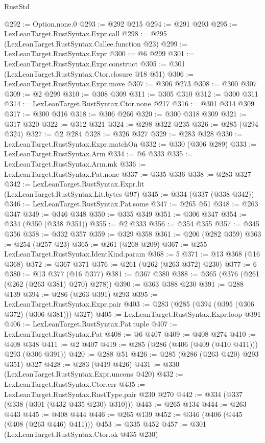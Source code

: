 \begin{lexlean}{RustStd}
\begin{coremodule}
@292 := Option.none.{0}
@293 := @292 @215
@294 := @291 @293
@295 := LexLeanTarget.RustSyntax.Expr.call
@298 := @295 (LexLeanTarget.RustSyntax.Callee.function @23)
@299 := LexLeanTarget.RustSyntax.Expr
@300 := @6 @299
@301 := LexLeanTarget.RustSyntax.Expr.construct
@305 := @301 (LexLeanTarget.RustSyntax.Ctor.closure @18 @51)
@306 := LexLeanTarget.RustSyntax.Expr.move
@307 := @306 @273
@308 := @300 @307
@309 := @2 @299
@310 := @308 @309
@311 := @305 @310
@312 := @300 @311
@314 := LexLeanTarget.RustSyntax.Ctor.none @217
@316 := @301 @314 @309
@317 := @300 @316
@318 := @306 @266
@320 := @300 @318 @309
@321 := @317 @320
@322 := @312 @321
@324 := @298 @322 @235
@326 := @285 (@294 @324)
@327 := @2 @284
@328 := @326 @327
@329 := @283 @328
@330 := LexLeanTarget.RustSyntax.Expr.matchOn
@332 := @330 (@306 @289)
@333 := LexLeanTarget.RustSyntax.Arm
@334 := @6 @333
@335 := LexLeanTarget.RustSyntax.Arm.mk
@336 := LexLeanTarget.RustSyntax.Pat.none
@337 := @335 @336
@338 := @283 @327
@342 := LexLeanTarget.RustSyntax.Expr.lit (LexLeanTarget.RustSyntax.Lit.bytes @97)
@345 := @334 (@337 (@338 @342))
@346 := LexLeanTarget.RustSyntax.Pat.some
@347 := @265 @51
@348 := @263 @347
@349 := @346 @348
@350 := @335 @349
@351 := @306 @347
@354 := @334 (@350 (@338 @351))
@355 := @2 @333
@356 := @354 @355
@357 := @345 @356
@358 := @332 @357
@359 := @329 @358
@361 := @206 (@282 @359)
@363 := @254 (@257 @23)
@365 := @261 (@268 @209)
@367 := @255 LexLeanTarget.RustSyntax.IdentKind.param
@368 := 5
@371 := @13 @368 (@16 @368)
@372 := @367 @371
@376 := @261 (@262 (@263 @372) @230)
@377 := 6
@380 := @13 @377 (@16 @377)
@381 := @367 @380
@388 := @365 (@376 (@261 (@262 (@263 @381) @270) @278))
@390 := @363 @388 @230
@391 := @288 @139
@394 := @286 (@263 @391) @293
@395 := LexLeanTarget.RustSyntax.Expr.pair
@403 := @283 (@285 (@394 (@395 (@306 @372) (@306 @381))) @327)
@405 := LexLeanTarget.RustSyntax.Expr.loop @391
@406 := LexLeanTarget.RustSyntax.Pat.tuple
@407 := LexLeanTarget.RustSyntax.Pat
@408 := @6 @407
@409 := @408 @274
@410 := @408 @348
@411 := @2 @407
@419 := @285 (@286 (@406 (@409 (@410 @411))) @293 (@306 @391))
@420 := @288 @51
@426 := @285 (@286 (@263 @420) @293 @351) @327
@428 := @283 (@419 @426)
@431 := @330 (LexLeanTarget.RustSyntax.Expr.uncons @420)
@432 := LexLeanTarget.RustSyntax.Ctor.err
@435 := LexLeanTarget.RustSyntax.RustType.pair @230 @270
@442 := @334 (@337 (@338 (@301 (@432 @435 @230) @310)))
@443 := @265 @134
@444 := @263 @443
@445 := @408 @444
@446 := @265 @139
@452 := @346 (@406 (@445 (@408 (@263 @446) @411)))
@453 := @335 @452
@457 := @301 (LexLeanTarget.RustSyntax.Ctor.ok @435 @230)

\end{coremodule}
\end{lexlean}
